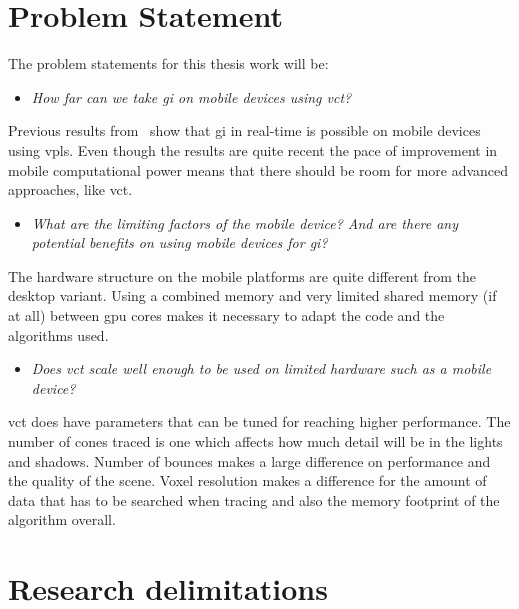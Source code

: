 \documentclass[a4paper, 12pt]{article}
\begin{document}
\section{Problem Statement}
\label{sec:Problem Statement}

The problem statements for this thesis work will be:

\begin{itemize}
  \item \textit{How far can we take \gls{gi} on mobile devices using \gls{vct}?}
\end{itemize}

Previous results from~\cite{gimobile} show that \gls{gi} in real-time is possible on mobile devices using \glspl{vpl}. Even though the results are quite recent the pace of improvement in mobile computational power means that there should be room for more advanced approaches, like \gls{vct}.

\begin{itemize}
  \item \textit{What are the limiting factors of the mobile device? And are there any potential benefits on using mobile devices for \gls{gi}?}
\end{itemize}

The hardware structure on the mobile platforms are quite different from the desktop variant. Using a combined memory and very limited shared memory (if at all) between \gls{gpu} cores makes it necessary to adapt the code and the algorithms used.

\begin{itemize}
  \item \textit{Does \gls{vct} scale well enough to be used on limited hardware such as a mobile device?}
\end{itemize}

vct does have parameters that can be tuned for reaching higher performance. The number of cones traced is one which affects how much detail will be in the lights and shadows. Number of bounces makes a large difference on performance and the quality of the scene. Voxel resolution makes a difference for the amount of data that has to be searched when tracing and also the memory footprint of the algorithm overall.

\section{Research delimitations}
\label{sec:Research delimitations}
\end{document}
